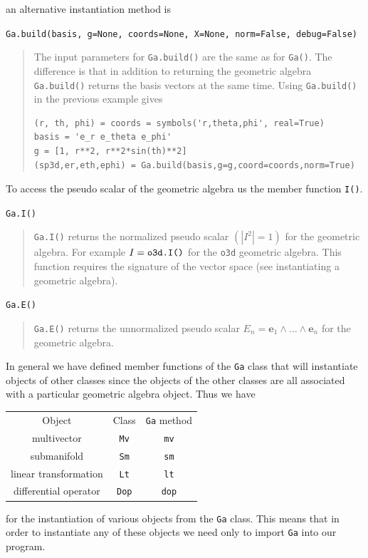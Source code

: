 \documentclass[12pt]{report}
\newcommand{\bm}[1]{\boldsymbol{#1}}
\newcommand{\lp}{\left (}
\newcommand{\rp}{\right )}
\newcommand{\abs}[1]{\left |{#1}\right |}
\newcommand{\W}{\wedge}
\newcommand{\paren}[1]{\lp {#1} \rp}
\newcommand{\T}[1]{\texttt{#1}}
\begin{document}
an alternative instantiation method is

\T{Ga.build(basis, g=None, coords=None, X=None, norm=False, debug=False)}
\begin{quote}
    The input parameters for \T{Ga.build()} are the same as for \T{Ga()}.  The difference is
    that in addition to returning the geometric algebra \T{Ga.build()} returns the basis vectors
    at the same time. Using \T{Ga.build()} in the previous example gives
   \begin{lstlisting}
(r, th, phi) = coords = symbols('r,theta,phi', real=True)
basis = 'e_r e_theta e_phi'
g = [1, r**2, r**2*sin(th)**2]
(sp3d,er,eth,ephi) = Ga.build(basis,g=g,coord=coords,norm=True)
    \end{lstlisting}

\end{quote}

To access the pseudo scalar of the geometric algebra us the member function \T{I()}.

\T{Ga.I()}
\begin{quote}
    \T{Ga.I()} returns the normalized pseudo scalar $\paren{\abs{I^{2}}=1}$ for the
    geometric algebra. For example $I = \mbox{\T{o3d.I()}}$ for the \T{o3d} geometric
    algebra.  This function requires the signature of the vector space (see instantiating
    a geometric algebra).
\end{quote}

\T{Ga.E()}
\begin{quote}
    \T{Ga.E()} returns the unnormalized pseudo scalar $E_{n} = \bm{e}_{1}\W\dots\W\bm{e}_{n}$
    for the geometric algebra.
\end{quote}

In general we have defined member functions of the \T{Ga} class that will instantiate objects
of other classes since the objects of the other classes are all associated with a particular
geometric algebra object.  Thus we have
\begin{center}
\begin{tabular}{ccc}
    Object &  Class & \T{Ga} method \\
    multivector & \T{Mv} & \T{mv} \\
    submanifold & \T{Sm} & \T{sm} \\
    linear transformation & \T{Lt} & \T{lt} \\
    differential operator & \T{Dop} & \T{dop}
\end{tabular}
\end{center}
for the instantiation of various objects from the \T{Ga} class.  This means that in order to
instantiate any of these objects we need only to import \T{Ga} into our program.
\end{document}
